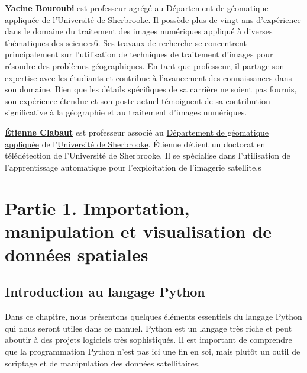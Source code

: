 \documentclass[
  11pt,
  letterpaper,
  open=any,
  twoside=false,
  french]{scrbook}
\begin{document}
\href{https://www.usherbrooke.ca/geomatique/departement/personnel/personnel-enseignant/yacine-bouroubi}{\textbf{Yacine
Bouroubi}} est professeur agrégé au
\href{https://www.usherbrooke.ca/geomatique/}{Département de géomatique
appliquée} de l'\href{https://www.usherbrooke.ca/}{Université de
Sherbrooke}. Il possède plus de vingt ans d'expérience dans le domaine
du traitement des images numériques appliqué à diverses thématiques des
sciences6. Ses travaux de recherche se concentrent principalement sur
l'utilisation de techniques de traitement d'images pour résoudre des
problèmes géographiques. En tant que professeur, il partage son
expertise avec les étudiants et contribue à l'avancement des
connaissances dans son domaine. Bien que les détails spécifiques de sa
carrière ne soient pas fournis, son expérience étendue et son poste
actuel témoignent de sa contribution significative à la géographie et au
traitement d'images numériques.

\href{https://www.linkedin.com/in/\%C3\%A9tienne-clabaut-793a4176/?originalSubdomain=ca}{\textbf{Étienne
Clabaut}} est professeur associé au
\href{https://www.usherbrooke.ca/geomatique/}{Département de géomatique
appliquée} de l'\href{https://www.usherbrooke.ca/}{Université de
Sherbrooke}. Étienne détient un doctorat en télédétection de
l'Université de Sherbrooke. Il se spécialise dans l'utilisation de
l'apprentissage automatique pour l'exploitation de l'imagerie
satellite.s

\part{Partie 1. Importation, manipulation et visualisation de données
spatiales}


\chapter{Introduction au langage Python}\label{sec-chap00}

Dans ce chapitre, nous présentons quelques éléments essentiels du
langage Python qui nous seront utiles dans ce manuel. Python est un
langage très riche et peut aboutir à des projets logiciels très
sophistiqués. Il est important de comprendre que la programmation Python
n'est pas ici une fin en soi, mais plutôt un outil de scriptage et de
manipulation des données satellitaires.
\end{document}
